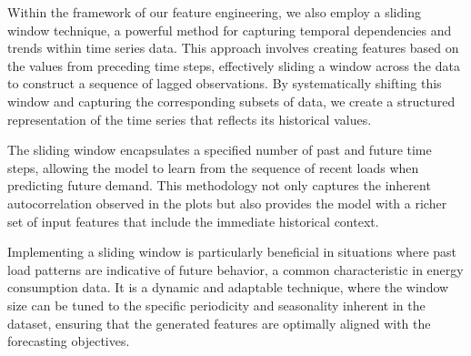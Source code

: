 \documentclass{article} %
\begin{document}
Within the framework of our feature engineering, we also employ a sliding window technique, a powerful method for capturing temporal dependencies and trends within time series data. This approach involves creating features based on the values from preceding time steps, effectively sliding a window across the data to construct a sequence of lagged observations. By systematically shifting this window and capturing the corresponding subsets of data, we create a structured representation of the time series that reflects its historical values. 

The sliding window encapsulates a specified number of past and future time steps, allowing the model to learn from the sequence of recent loads when predicting future demand. This methodology not only captures the inherent autocorrelation observed in the plots but also provides the model with a richer set of input features that include the immediate historical context. 

Implementing a sliding window is particularly beneficial in situations where past load patterns are indicative of future behavior, a common characteristic in energy consumption data. It is a dynamic and adaptable technique, where the window size can be tuned to the specific periodicity and seasonality inherent in the dataset, ensuring that the generated features are optimally aligned with the forecasting objectives.  
\end{document}
